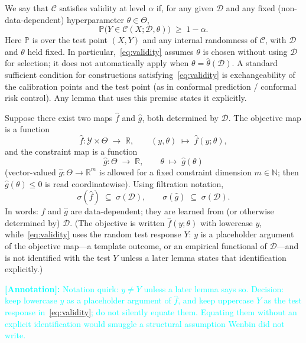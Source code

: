 \documentclass[12pt]{article}
\theoremstyle{plain}
\newcommand{\annote}[1]{\textcolor{cyan}{\textbf{[Annotation]:} #1}}
\begin{document}
\label{def:validity}
We say that $\mathcal{C}$ satisfies validity at level $\alpha$ if, for any given $\mathcal{D}$ and any fixed (non-data-dependent) hyperparameter $\theta\in\Theta$,
\begin{equation}
    \label{eq:validity}
    \mathbb{P}\bigl( Y \in \mathcal{C}(X;\mathcal{D},\theta) \bigr)
    \;\ge\;
    1-\alpha.
\end{equation}
Here $\mathbb{P}$ is over the test point $(X,Y)$ and any internal randomness of $\mathcal{C}$, with $\mathcal{D}$ and $\theta$ held fixed.
In particular,~\eqref{eq:validity} assumes $\theta$ is chosen without using $\mathcal{D}$ for selection; it does not automatically apply when $\theta=\hat\theta(\mathcal{D})$.
\label{rem:exchangeability}
A standard sufficient condition for constructions satisfying~\eqref{eq:validity} is exchangeability of the calibration points and the test point (as in conformal prediction / conformal risk control).
Any lemma that uses this premise states it explicitly.

\label{def:fhat-ghat}
Suppose there exist two maps $\hat f$ and $\hat g$, both determined by $\mathcal{D}$.
The objective map is a function
\[
\hat f
:
\mathcal{Y}\times\Theta
\;\longrightarrow\;
\mathbb{R},
\qquad
(y,\theta)\;\longmapsto\;\hat f(y;\theta),
\]
and the constraint map is a function
\[
\hat g
:
\Theta
\;\longrightarrow\;
\mathbb{R},
\qquad
\theta\;\longmapsto\;\hat g(\theta)
\]
(vector-valued $\hat g:\Theta\to\mathbb{R}^{m}$ is allowed for a fixed constraint dimension $m\in\mathbb{N}$; then $\hat g(\theta)\le 0$ is read coordinatewise).
Using filtration notation,
\begin{equation}
  \label{eq:filtration}
  \sigma(\hat f)\;\subseteq\;\sigma(\mathcal{D}),
  \qquad
  \sigma(\hat g)\;\subseteq\;\sigma(\mathcal{D}).
\end{equation}
In words: $\hat f$ and $\hat g$ are data-dependent; they are learned from (or otherwise determined by) $\mathcal{D}$.
\label{rem:y-vs-Y}
(The objective is written $\hat f(y;\theta)$ with lowercase $y$, while~\eqref{eq:validity} uses the random test response $Y$: $y$ is a placeholder argument of the objective map---a template outcome, or an empirical functional of $\mathcal{D}$---and is not identified with the test $Y$ unless a later lemma states that identification explicitly.)

\annote{Notation quirk: $y\neq Y$ unless a later lemma says so.
Decision: keep lowercase $y$ as a placeholder argument of $\hat f$, and keep uppercase $Y$ as the test response in~\eqref{eq:validity}; do not silently equate them.
Equating them without an explicit identification would smuggle a structural assumption Wenbin did not write.}
\end{document}
